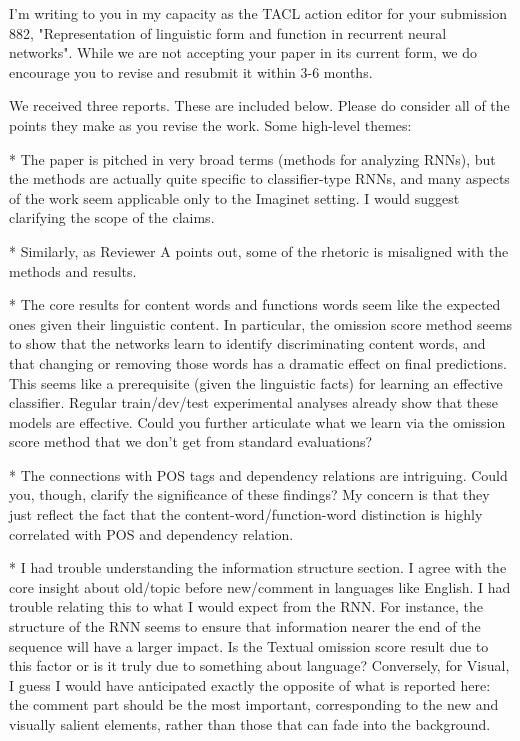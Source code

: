 \documentclass[10pt,a4paper]{letter}
\begin{document}
I'm writing to you in my capacity as the TACL action editor for your
submission 882, "Representation of linguistic form and function in recurrent
neural networks". While we are not accepting your paper in its current form,
we do encourage you to revise and resubmit it within 3-6 months.

We received three reports. These are included below. Please do consider all
of the points they make as you revise the work. Some high-level themes:

* The paper is pitched in very broad terms (methods for analyzing RNNs), but
the methods are actually quite specific to classifier-type RNNs, and many
aspects of the work seem applicable only to the Imaginet setting. I would
suggest clarifying the scope of the claims.

* Similarly, as Reviewer A points out, some of the rhetoric is misaligned
with the methods and results.

* The core results for content words and functions words seem like the
expected ones given their linguistic content. In particular, the omission
score method seems to show that the networks learn to identify
discriminating content words, and that
changing or removing those words has a dramatic effect on final predictions.
This seems like a prerequisite (given the linguistic facts) for learning an
effective classifier. Regular train/dev/test experimental analyses already
show that these models are effective. Could you further articulate what we
learn via the omission score method that we don't get from standard
evaluations?

* The connections with POS tags and dependency relations are intriguing.
Could you, though, clarify the significance of these findings? My concern is
that they just reflect the fact that the content-word/function-word
distinction is highly correlated with POS and dependency relation.

* I had trouble understanding the information structure section. I agree
with the core insight about old/topic before new/comment in languages like
English. I had trouble relating this to what I would expect from the RNN.
For instance, the structure of the RNN seems to ensure that information
nearer the end of the sequence will have a larger impact. Is the Textual
omission score result due to this factor or is it truly due to something
about language? Conversely, for Visual, I guess I would have anticipated
exactly the opposite of what is reported here: the comment part should be
the most important, corresponding to the new and visually salient elements,
rather than those that can fade into the background.
\end{document}
